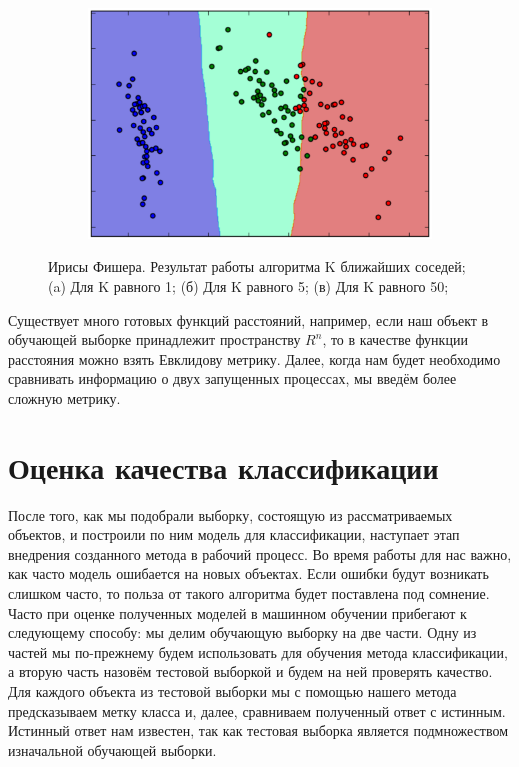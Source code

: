 \begin{figure}[ht]
\begin{subfigure}[b]{0.3\textwidth}
    \centering
        \includegraphics[scale=0.22]{pasted-image-25.png}
        \caption{}
    \end{subfigure}
    \caption{ Ирисы Фишера. Результат работы алгоритма K ближайших соседей; (a) Для K равного 1; (б) Для K равного 5; (в) Для K равного 50;}
    \label{fig_parsetree}
\end{figure}

Существует много готовых функций расстояний, например, если наш объект в обучающей выборке принадлежит пространству $R^n$, то в качестве функции расстояния можно взять Евклидову метрику. Далее, когда нам будет необходимо сравнивать информацию о двух запущенных процессах, мы введём более сложную метрику.

\section{Оценка качества классификации}

После того, как мы подобрали выборку, состоящую из рассматриваемых объектов, и построили по ним модель для классификации, наступает этап внедрения созданного метода в рабочий процесс. Во время работы для нас важно, как часто модель ошибается на новых объектах. Если ошибки будут возникать слишком часто, то польза от такого алгоритма будет поставлена под сомнение. 
Часто при оценке полученных моделей в машинном обучении прибегают к следующему способу: мы делим обучающую выборку на две части. Одну из частей мы по-прежнему будем использовать для обучения метода классификации, а вторую часть назовём тестовой выборкой и будем на ней проверять качество. Для каждого объекта из тестовой выборки мы с помощью нашего метода предсказываем метку класса и, далее, сравниваем полученный ответ с истинным. Истинный ответ нам известен, так как тестовая выборка является подмножеством изначальной обучающей выборки.

